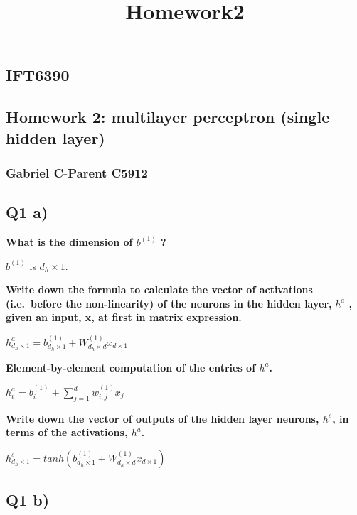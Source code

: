 \documentclass{article}
\title{Homework2}
\begin{document}
    
    
    \maketitle
    
    

    
    \subsection{IFT6390}\label{ift6390}

\subsection{Homework 2: multilayer perceptron (single hidden
layer)}\label{homework-2-multilayer-perceptron-single-hidden-layer}

\subsubsection{Gabriel C-Parent C5912}\label{gabriel-c-parent-c5912}

    \subsection{Q1 a)}\label{q1-a}

    \textbf{What is the dimension of $b^{(1)}$ ?}

$b^{(1)}$ is $d_h \times 1$.

    \textbf{Write down the formula to calculate the vector of activations}
\textbf{(i.e.~before the non-linearity) of the neurons in the hidden
layer,} \textbf{$h^a$ , given an input, x, at first in matrix
expression.}

$h^a_{d_h \times 1} = b^{(1)}_{d_h \times 1} + W^{(1)}_{d_h \times d} x_{d \times 1} $

    \textbf{Element-by-element computation of the entries of $h^a$.}

$h^a_i = b^{(1)}_i + \sum\limits_{j=1}^d w^{(1)}_{i, j}x_j$

    \textbf{Write down the vector of outputs of the hidden layer neurons,
$h^s$, in terms of the activations, $h^a$.}

$h^s_{d_h \times 1} = tanh(b^{(1)}_{d_h \times 1} + W^{(1)}_{d_h \times d} x_{d \times 1}) $

    \subsection{Q1 b)}\label{q1-b}
\end{document}
